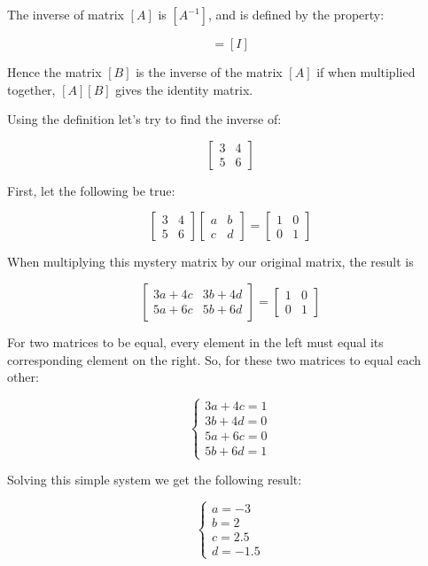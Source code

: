 The inverse of matrix \([A]\) is \([A^{-1}]\), and is defined by the
property:

\begin{equation} [A][A^{-1}]=[I] \end{equation}

Hence the matrix \([B]\) is the inverse of the matrix \([A]\) if when
multiplied together, \([A][B]\) gives the identity matrix. 

Using the definition let's try to find the inverse of:

\[
\begin{bmatrix}
3 & 4\\
5 & 6
\end{bmatrix}
\]

First, let the following be true:

\[
\begin{bmatrix}
3 & 4\\
5 & 6
\end{bmatrix}
\begin{bmatrix}
a & b\\
c & d
\end{bmatrix}
=
\begin{bmatrix}
1 & 0\\
0 & 1
\end{bmatrix}
\]

When multiplying this mystery matrix by our original matrix, the result is

\[
\begin{bmatrix}
3a+4c & 3b+4d\\
5a+6c & 5b+6d
\end{bmatrix}
=
\begin{bmatrix}
1 & 0\\
0 & 1
\end{bmatrix}
\]

For two matrices to be equal, every element in the left must equal its
corresponding element on the right. So, for these two matrices to equal
each other:

\[
\begin{cases}
3a+4c=1\\
3b+4d=0\\
5a+6c=0\\
5b+6d=1
\end{cases}
\]

Solving this simple system we get the following result:

\[
\begin{cases}
a=−3\\
b=2\\
c=2.5\\
d=−1.5
\end{cases}
\]

